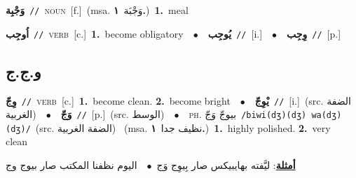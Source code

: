 \documentclass[10pt,a4paper,twoside]{article} %
\begin{document}
\begin{multicols}{2}
{{{{{{{{\setlength\topsep{0pt}\textbf{\foreignlanguage{arabic}{وَجْبِة}}\ {\color{gray}\texttt{//}\color{black}}\ \textsc{noun}\ [f.]\ \color{gray}(msa. \foreignlanguage{arabic}{وَجْبَة}~\foreignlanguage{arabic}{\textbf{١.}})\color{black}\ \textbf{1.}~meal\ 

{\setlength\topsep{0pt}\textbf{\foreignlanguage{arabic}{اُوجِب}}\ {\color{gray}\texttt{//}\color{black}}\ \textsc{verb}\ [c.]\ \textbf{1.}~become obligatory\ \ $\bullet$\ \ \setlength\topsep{0pt}\textbf{\foreignlanguage{arabic}{يُوجِب}}\ {\color{gray}\texttt{//}\color{black}}\ [i.]\ \ $\bullet$\ \ \setlength\topsep{0pt}\textbf{\foreignlanguage{arabic}{وِجِب}}\ {\color{gray}\texttt{//}\color{black}}\ [p.]\ 

\vspace{-3mm}
\subsection*{\color{blue}\foreignlanguage{arabic}{و.ج.ج}\color{blue}{}} 

{\setlength\topsep{0pt}\textbf{\foreignlanguage{arabic}{وِجّ}}\ {\color{gray}\texttt{//}\color{black}}\ \textsc{verb}\ [c.]\ \textbf{1.}~become clean.  \textbf{2.}~become bright\ \ $\bullet$\ \ \setlength\topsep{0pt}\textbf{\foreignlanguage{arabic}{يْوِجّ}}\ {\color{gray}\texttt{//}\color{black}}\ [i.]\ (src. \color{gray}\foreignlanguage{arabic}{الضفة الغربية}\color{black})\ \ $\bullet$\ \ \setlength\topsep{0pt}\textbf{\foreignlanguage{arabic}{وَجّ}}\ {\color{gray}\texttt{//}\color{black}}\ [p.]\ (src. \color{gray}\foreignlanguage{arabic}{الوسط}\color{black})\ \ $\bullet$\ \ \textsc{ph.} \color{gray} \foreignlanguage{arabic}{بيوجّ وَجّ}\color{black}\ {\color{gray}\texttt{/{\sffamily biwi(dʒ)(dʒ) wa(dʒ)(dʒ)}/}\color{black}}\ \color{gray}(src. \foreignlanguage{arabic}{الضفة الغربية})\color{black}\ \color{gray} (msa. \foreignlanguage{arabic}{نظيف جدا}~\foreignlanguage{arabic}{\textbf{١.}})\color{black}\ \textbf{1.}~highly polished.  \textbf{2.}~very clean\  \begin{flushright}\color{gray}\foreignlanguage{arabic}{\textbf{\underline{\foreignlanguage{arabic}{أمثلة}}}: ليَّفته بهايبيكس صار بِيوِج وَج\ $\bullet$\ \  اليوم نظفنا المكتب صار بيوج وج}\end{flushright}\color{black}} \vspace{2mm}

}}}}}}}}}
\end{multicols}
\end{document}

